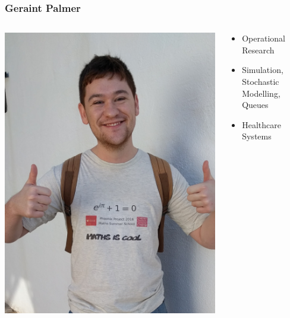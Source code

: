 \documentclass{beamer}
\begin{document}
\begin{frame}
  \frametitle{Geraint Palmer}
  \begin{columns}
    \begin{column}{0.5\textwidth}
      \begin{center}
        \includegraphics[width=\textwidth]{GeraintPhoto}
      \end{center}
    \end{column}
    \begin{column}{0.5\textwidth}
      \begin{itemize}
        \setlength\itemsep{3em}
        \item Operational Research
        \item Simulation, Stochastic Modelling, Queues
        \item Healthcare Systems
      \end{itemize}
    \end{column}
  \end{columns}
\end{frame}
\end{document}
